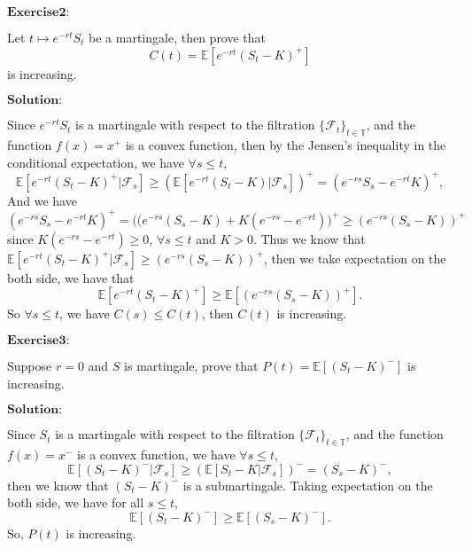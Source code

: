 \documentclass[12pt,a4paper]{ctexart}
\begin{document}
\vspace{8pt}

$\textbf{Exercise2:}$

Let $t \mapsto e^{-rt}S_t$ be a martingale, then prove that 
$$C(t) = \mathbb E[e^{-rt}(S_t - K)^+]$$ 
is increasing.

\vspace{8pt}
$\textbf{Solution:}$

Since $e^{-rt} S_{t}$ is a martingale with respect to the filtration $\{\mathcal{F}_{t}\}_{t \in \mathbb{T}}$, and the function $f(x) = x^{+}$ is a convex function, then by the Jensen's inequality in the conditional expectation, we have $\forall s \leq t$,
$$\mathbb{E} [e^{-rt}(S_{t} - K)^{+} | \mathcal{F}_{s}] \geq (\mathbb{E} [e^{-rt}(S_{t} - K) | \mathcal{F}_{s}])^{+} = (e^{-rs}S_{s} - e^{-rt} K)^{+},$$
And we have 
$$(e^{-rs}S_{s} - e^{-rt} K)^{+} = \big((e^{-rs}(S_{s} - K) + K (e^{-rs} - e^{-rt})\big)^{+} \geq (e^{-rs}(S_{s} - K))^{+}$$
since $K (e^{-rs} -  e^{-rt}) \geq 0$, $\forall s \leq t$ and $K > 0$. Thus we know that $\mathbb{E} [e^{-rt}(S_{t} - K)^{+} | \mathcal{F}_{s}] \geq (e^{-rs}(S_{s} - K))^{+}$, then we take expectation on the both side, we have that
$$\mathbb{E} [e^{-rt}(S_{t} - K)^{+}] \geq \mathbb{E} [(e^{-rs}(S_{s} - K))^{+}].$$
So $\forall s \leq t$, we have $C(s) \leq C(t)$, then $C(t)$ is increasing.

\vspace{8pt}

$\textbf{Exercise3:}$

Suppose $r = 0$ and $S$ is martingale, prove that $P(t) = \mathbb E [(S_t - K)^-]$ is increasing.

\vspace{8pt}
$\textbf{Solution:}$

Since $ S_{t}$ is a martingale with respect to the filtration $\{\mathcal{F}_{t}\}_{t \in \mathbb{T}}$, and the function $f(x) = x^{-}$ is a convex function, we have $\forall s \leq t$,
$$\mathbb{E} [(S_{t} - K)^{-} | \mathcal{F}_{s}] \geq (\mathbb{E} [S_{t} - K| \mathcal{F}_{s}])^{-} = (S_{s} - K)^{-},$$
then we know that $(S_{t} - K)^{-}$ is a submartingale. Taking expectation on the both side, we have for all $s \leq t$,
$$\mathbb{E} [(S_{t} - K)^{-} ] \geq \mathbb{E} [(S_{s} - K)^{-}].$$
So, $P(t)$ is increasing.
\end{document}
